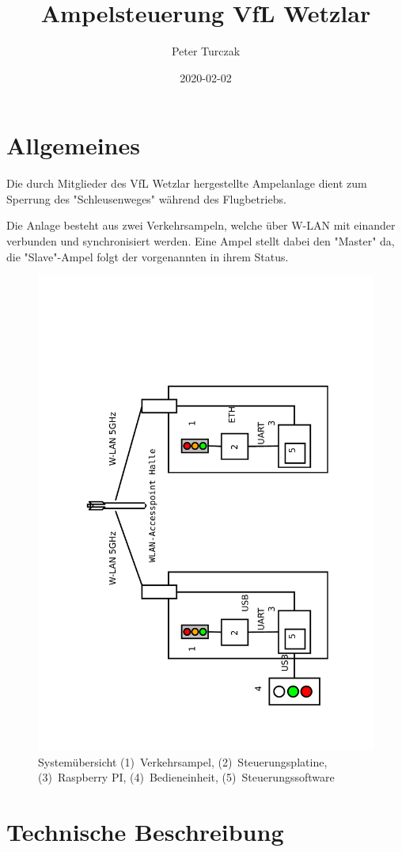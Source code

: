 \documentclass[a4paper, ngerman]{scrartcl}
\begin{document}
\title{Ampelsteuerung VfL Wetzlar}
\author{Peter Turczak}
\date{2020-02-02}

\maketitle
\tableofcontents
\clearpage
\section{Allgemeines}
Die durch Mitglieder des VfL Wetzlar hergestellte Ampelanlage dient zum Sperrung des "{}Schleusenweges"{} während des Flugbetriebs.

Die Anlage besteht aus zwei Verkehrsampeln, welche über W-LAN mit einander verbunden und synchronisiert werden. Eine Ampel stellt dabei den "{}Master"{} da, die "{}Slave"{}-Ampel folgt der vorgenannten in ihrem Status.

\begin{figure}
	\includegraphics[keepaspectratio, width=.7\textwidth, angle=270]{Ampel_Uebersicht.pdf}
	\caption{Systemübersicht (1)~Verkehrsampel, (2)~Steuerungsplatine, (3)~Raspberry PI, (4)~Bedieneinheit, (5)~Steuerungssoftware}
\end{figure}

\section{Technische Beschreibung}
\end{document}
